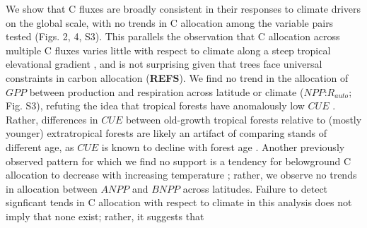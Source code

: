 \documentclass[
]{article}
\begin{document}
We show that C fluxes are broadly consistent in their responses to
climate drivers on the global scale, with no trends in C allocation
among the variable pairs tested (Figs. 2, 4, S3). This parallels the
observation that C allocation across multiple C fluxes varies little
with respect to climate along a steep tropical elevational gradient
\citetext{\citealp{malhi_variation_2017}; \citealp[but
see][]{moser_elevation_2011}}, and is not surprising given that trees
face universal constraints in carbon allocation (\textbf{REFS}). We find
no trend in the allocation of \(GPP\) between production and respiration
across latitude or climate (\(NPP\):\(R_{auto}\); Fig. S3), refuting the
idea that tropical forests have anomalously low \(CUE\)
\citep{de_lucia_forest_2007, malhi_productivity_2012, anderson-teixeira_carbon_2016}.
Rather, differences in \(CUE\) between old-growth tropical forests
relative to (mostly younger) extratropical forests are likely an
artifact of comparing stands of different age, as \(CUE\) is known to
decline with forest age
\citep{de_lucia_forest_2007, piao_forest_2010, collalti_is_2019}.
Another previously observed pattern for which we find no support is a
tendency for belowground C allocation to decrease with increasing
temperature \citep{moser_elevation_2011, gill_belowground_2016}; rather,
we observe no trends in allocation between \(ANPP\) and \(BNPP\) across
latitudes. Failure to detect signficant tends in C allocation with
respect to climate in this analysis does not imply that none exist;
rather, it suggests that
\end{document}

